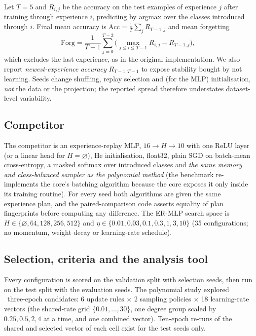 \documentclass[11pt,a4paper]{article}
\newcommand{\acc}{\mathrm{Acc}}
\newcommand{\forget}{\mathrm{Forg}}
\begin{document}
Let $T=5$ and $R_{i,j}$ be the accuracy on the test examples of experience $j$ after training through experience $i$, predicting by argmax over the classes introduced through $i$. Final mean accuracy is $\acc=\frac1T\sum_j R_{T-1,j}$ and mean forgetting
\begin{equation}
\forget=\frac{1}{T-1}\sum_{j=0}^{T-2}\Big(\max_{j\le i\le T-1}R_{i,j}-R_{T-1,j}\Big),
\end{equation}
which excludes the last experience, as in the original implementation. We also report \emph{newest-experience accuracy} $R_{T-1,T-1}$ to expose stability bought by not learning. Seeds change shuffling, replay selection and (for the MLP) initialisation, \emph{not} the data or the projection; the reported spread therefore understates dataset-level variability.

\subsection{Competitor}
The competitor is an experience-replay MLP, $16\to H\to10$ with one ReLU layer (or a linear head for $H=\varnothing$), He initialisation, float32, plain SGD on batch-mean cross-entropy, a masked softmax over introduced classes and \emph{the same memory and class-balanced sampler as the polynomial method} (the benchmark re-implements the core's batching algorithm because the core exposes it only inside its training routine). For every seed both algorithms are given the same experience plan, and the paired-comparison code asserts equality of plan fingerprints before computing any difference. The ER-MLP search space is $H\in\{\varnothing,64,128,256,512\}$ and $\eta\in\{0.01,0.03,0.1,0.3,1,3,10\}$ (35 configurations; no momentum, weight decay or learning-rate schedule).

\subsection{Selection, criteria and the analysis tool}
Every configuration is scored on the validation split with selection seeds, then run on the test split with the evaluation seeds. The polynomial study explored \numPolyCandidatesThree\ three-epoch candidates: 6 update rules $\times$ 2 sampling policies $\times$ 18 learning-rate vectors (the shared-rate grid $\{0.01,\dots,30\}$, one degree group scaled by $0.25,0.5,2,4$ at a time, and one combined vector). Ten-epoch re-runs of the shared and selected vector of each cell exist for the test seeds only.
\end{document}
